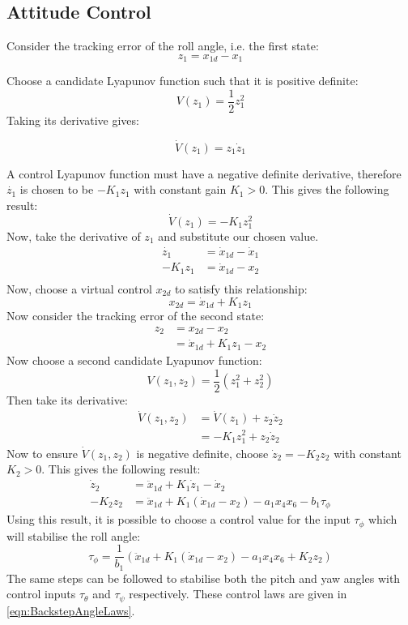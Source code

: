 \subsection{Attitude Control}
Consider the tracking error of the roll angle, i.e. the first state:
\[z_{1}= x_{1d}-x_{1}\]

Choose a candidate Lyapunov function such that it is positive definite:
\[V(z_{1})=\frac{1}{2}z_{1}^{2}\]
Taking its derivative gives:

\[\dot{V}(z_{1})=z_{1}\dot{z}_{1}\]

A control Lyapunov function must have a negative definite derivative, therefore \(\dot{z_{1}}\) is chosen to be \(-K_{1}z_{1}\) with constant gain \(K_{1}>0\). This gives the following result:
\[\dot{V}(z_{1})=-K_{1}z_{1}^{2}\]
Now, take the derivative of \(z_{1}\) and substitute our chosen value.
\begin{equation*}
\begin{split}
\dot{z_{1}}&=\dot{x}_{1d}-\dot{x}_{1}\\
-K_{1}z_{1}&=\dot{x}_{1d}-x_{2}\\
\end{split}
\end{equation*}
Now, choose a virtual control \(x_{2d}\) to satisfy this relationship:
\[x_{2d}=\dot{x}_{1d}+K_{1}z_{1}\]
Now consider the tracking error of the second state:
\begin{equation*}
\begin{split}
z_{2}&=x_{2d}-x_{2}\\
&=\dot{x}_{1d}+K_{1}z_{1}-x_{2}
\end{split}
\end{equation*}
Now choose a second candidate Lyapunov function:
\[V(z_{1},z_{2})=\frac{1}{2}(z_{1}^2+z_{2}^2)\]
Then take its derivative:
\begin{equation*}
\begin{split}
\dot{V}(z_{1},z_{2})&=\dot{V}(z_{1})+z_{2}\dot{z}_{2}\\
&=-K_{1}z_{1}^{2}+z_{2}\dot{z}_{2}
\end{split}
\end{equation*}
Now to ensure \(\dot{V}(z_{1},z_{2})\) is negative definite, choose \(\dot{z}_{2}=-K_{2}z_{2}\) with constant \(K_{2}>0\). This gives the following result:
\begin{equation*}
\begin{split}
\dot{z}_{2}&=\ddot{x}_{1d}+K_{1}\dot{z}_{1}-\dot{x}_{2}\\
-K_{2}z_{2}&=\ddot{x}_{1d}+K_{1}(\dot{x}_{1d}-x_{2})-a_{1}x_{4}x_{6}-b_{1}\tau_{\phi}
\end{split}
\end{equation*}
Using this result, it is possible to choose a control value for the input \(\tau_{\phi}\) which will stabilise the roll angle:
\begin{equation*}
\tau_{\phi}=\frac{1}{b_{1}}(\ddot{x}_{1d}+K_{1}(\dot{x}_{1d}-x_{2})-a_{1}x_{4}x_{6}+K_{2}z_{2})
\end{equation*}
The same steps can be followed to stabilise both the pitch and yaw angles with control inputs \(\tau_{\theta}\) and \(\tau_{\psi}\) respectively. These control laws are given in \eqref{eqn:BackstepAngleLaws}.

